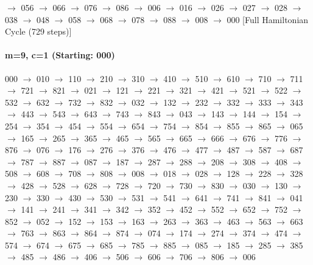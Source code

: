 $\rightarrow$ 056 $\rightarrow$ 066 $\rightarrow$ 076 $\rightarrow$ 086 $\rightarrow$ 006 $\rightarrow$ 016 $\rightarrow$ 026 $\rightarrow$ 027 $\rightarrow$ 028 $\rightarrow$ 038 $\rightarrow$ 048 $\rightarrow$ 058 $\rightarrow$ 068 $\rightarrow$ 078 $\rightarrow$ 088 $\rightarrow$ 008 $\rightarrow$ 000 [Full Hamiltonian Cycle (729 steps)]

\paragraph{m=9, c=1 (Starting: 000)}


000 $\rightarrow$ 010 $\rightarrow$ 110 $\rightarrow$ 210 $\rightarrow$ 310 $\rightarrow$ 410 $\rightarrow$ 510 $\rightarrow$ 610 $\rightarrow$ 710 $\rightarrow$ 711 $\rightarrow$ 721 $\rightarrow$ 821 $\rightarrow$ 021 $\rightarrow$ 121 $\rightarrow$ 221 $\rightarrow$ 321 $\rightarrow$ 421 $\rightarrow$ 521 $\rightarrow$ 522 $\rightarrow$ 532 $\rightarrow$ 632 $\rightarrow$ 732 $\rightarrow$ 832 $\rightarrow$ 032 $\rightarrow$ 132 $\rightarrow$ 232 $\rightarrow$ 332 $\rightarrow$ 333 $\rightarrow$ 343 $\rightarrow$ 443 $\rightarrow$ 543 $\rightarrow$ 643 $\rightarrow$ 743 $\rightarrow$ 843 $\rightarrow$ 043 $\rightarrow$ 143 $\rightarrow$ 144 $\rightarrow$ 154 $\rightarrow$ 254 $\rightarrow$ 354 $\rightarrow$ 454 $\rightarrow$ 554 $\rightarrow$ 654 $\rightarrow$ 754 $\rightarrow$ 854 $\rightarrow$ 855 $\rightarrow$ 865 $\rightarrow$ 065 $\rightarrow$ 165 $\rightarrow$ 265 $\rightarrow$ 365 $\rightarrow$ 465 $\rightarrow$ 565 $\rightarrow$ 665 $\rightarrow$ 666 $\rightarrow$ 676 $\rightarrow$ 776 $\rightarrow$ 876 $\rightarrow$ 076 $\rightarrow$ 176 $\rightarrow$ 276 $\rightarrow$ 376 $\rightarrow$ 476 $\rightarrow$ 477 $\rightarrow$ 487 $\rightarrow$ 587 $\rightarrow$ 687 $\rightarrow$ 787 $\rightarrow$ 887 $\rightarrow$ 087 $\rightarrow$ 187 $\rightarrow$ 287 $\rightarrow$ 288 $\rightarrow$ 208 $\rightarrow$ 308 $\rightarrow$ 408 $\rightarrow$ 508 $\rightarrow$ 608 $\rightarrow$ 708 $\rightarrow$ 808 $\rightarrow$ 008 $\rightarrow$ 018 $\rightarrow$ 028 $\rightarrow$ 128 $\rightarrow$ 228 $\rightarrow$ 328 $\rightarrow$ 428 $\rightarrow$ 528 $\rightarrow$ 628 $\rightarrow$ 728 $\rightarrow$ 720 $\rightarrow$ 730 $\rightarrow$ 830 $\rightarrow$ 030 $\rightarrow$ 130 $\rightarrow$ 230 $\rightarrow$ 330 $\rightarrow$ 430 $\rightarrow$ 530 $\rightarrow$ 531 $\rightarrow$ 541 $\rightarrow$ 641 $\rightarrow$ 741 $\rightarrow$ 841 $\rightarrow$ 041 $\rightarrow$ 141 $\rightarrow$ 241 $\rightarrow$ 341 $\rightarrow$ 342 $\rightarrow$ 352 $\rightarrow$ 452 $\rightarrow$ 552 $\rightarrow$ 652 $\rightarrow$ 752 $\rightarrow$ 852 $\rightarrow$ 052 $\rightarrow$ 152 $\rightarrow$ 153 $\rightarrow$ 163 $\rightarrow$ 263 $\rightarrow$ 363 $\rightarrow$ 463 $\rightarrow$ 563 $\rightarrow$ 663 $\rightarrow$ 763 $\rightarrow$ 863 $\rightarrow$ 864 $\rightarrow$ 874 $\rightarrow$ 074 $\rightarrow$ 174 $\rightarrow$ 274 $\rightarrow$ 374 $\rightarrow$ 474 $\rightarrow$ 574 $\rightarrow$ 674 $\rightarrow$ 675 $\rightarrow$ 685 $\rightarrow$ 785 $\rightarrow$ 885 $\rightarrow$ 085 $\rightarrow$ 185 $\rightarrow$ 285 $\rightarrow$ 385 $\rightarrow$ 485 $\rightarrow$ 486 $\rightarrow$ 406 $\rightarrow$ 506 $\rightarrow$ 606 $\rightarrow$ 706 $\rightarrow$ 806 $\rightarrow$ 006 